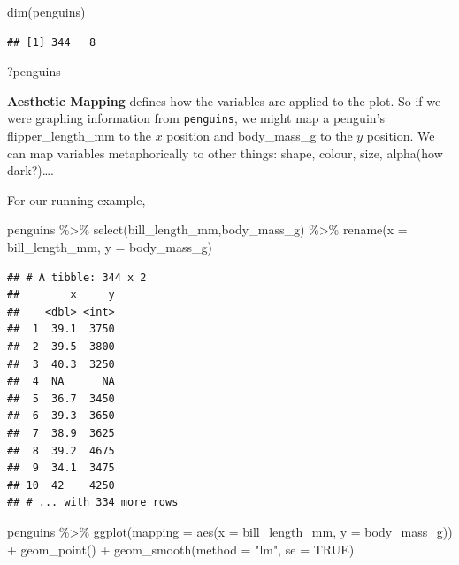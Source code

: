 \documentclass[
]{article}
\newenvironment{Shaded}{\begin{snugshade}}{\end{snugshade}}
\newcommand{\AttributeTok}[1]{\textcolor[rgb]{0.77,0.63,0.00}{#1}}
\newcommand{\ConstantTok}[1]{\textcolor[rgb]{0.00,0.00,0.00}{#1}}
\newcommand{\FunctionTok}[1]{\textcolor[rgb]{0.00,0.00,0.00}{#1}}
\newcommand{\NormalTok}[1]{#1}
\newcommand{\SpecialCharTok}[1]{\textcolor[rgb]{0.00,0.00,0.00}{#1}}
\newcommand{\StringTok}[1]{\textcolor[rgb]{0.31,0.60,0.02}{#1}}
\begin{document}
\begin{Shaded}
\begin{Highlighting}[]
\FunctionTok{dim}\NormalTok{(penguins)}
\end{Highlighting}
\end{Shaded}

\begin{verbatim}
## [1] 344   8
\end{verbatim}

\begin{Shaded}
\begin{Highlighting}[]
\NormalTok{?penguins}
\end{Highlighting}
\end{Shaded}

\textbf{Aesthetic Mapping} defines how the variables are applied to the
plot. So if we were graphing information from \texttt{penguins}, we
might map a penguin's flipper\_length\_mm to the \(x\) position and
body\_mass\_g to the \(y\) position. We can map variables metaphorically
to other things: shape, colour, size, alpha(how dark?)\ldots.

For our running example,

\begin{Shaded}
\begin{Highlighting}[]
\NormalTok{penguins }\SpecialCharTok{\%\textgreater{}\%}
  \FunctionTok{select}\NormalTok{(bill\_length\_mm,body\_mass\_g) }\SpecialCharTok{\%\textgreater{}\%}
  \FunctionTok{rename}\NormalTok{(}\AttributeTok{x =}\NormalTok{ bill\_length\_mm,}
         \AttributeTok{y =}\NormalTok{ body\_mass\_g)}
\end{Highlighting}
\end{Shaded}

\begin{verbatim}
## # A tibble: 344 x 2
##        x     y
##    <dbl> <int>
##  1  39.1  3750
##  2  39.5  3800
##  3  40.3  3250
##  4  NA      NA
##  5  36.7  3450
##  6  39.3  3650
##  7  38.9  3625
##  8  39.2  4675
##  9  34.1  3475
## 10  42    4250
## # ... with 334 more rows
\end{verbatim}

\begin{Shaded}
\begin{Highlighting}[]
\NormalTok{penguins }\SpecialCharTok{\%\textgreater{}\%} 
  \FunctionTok{ggplot}\NormalTok{(}\AttributeTok{mapping =} \FunctionTok{aes}\NormalTok{(}\AttributeTok{x =}\NormalTok{ bill\_length\_mm, }\AttributeTok{y =}\NormalTok{ body\_mass\_g)) }\SpecialCharTok{+}
  \FunctionTok{geom\_point}\NormalTok{() }\SpecialCharTok{+} 
  \FunctionTok{geom\_smooth}\NormalTok{(}\AttributeTok{method =} \StringTok{"lm"}\NormalTok{, }\AttributeTok{se =} \ConstantTok{TRUE}\NormalTok{)}
\end{Highlighting}
\end{Shaded}
\end{document}
